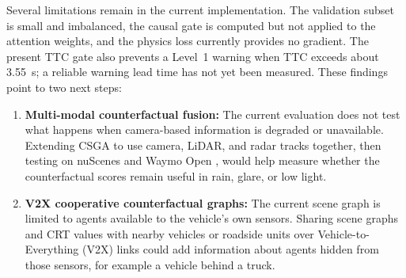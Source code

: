 Several limitations remain in the current implementation. The validation subset is small and imbalanced, the causal gate is computed but not applied to the attention weights, and the physics loss currently provides no gradient. The present TTC gate also prevents a Level~1 warning when TTC exceeds about 3.55~s; a reliable warning lead time has not yet been measured. These findings point to two next steps:
\begin{enumerate}
    \item \textbf{Multi-modal counterfactual fusion:} The current evaluation does not test what happens when camera-based information is degraded or unavailable. Extending CSGA to use camera, LiDAR, and radar tracks together, then testing on nuScenes \cite{caesar2020nuscenes} and Waymo Open \cite{sun2020waymo}, would help measure whether the counterfactual scores remain useful in rain, glare, or low light.
    \item \textbf{V2X cooperative counterfactual graphs:} The current scene graph is limited to agents available to the vehicle's own sensors. Sharing scene graphs and CRT values with nearby vehicles or roadside units over Vehicle-to-Everything (V2X) links could add information about agents hidden from those sensors, for example a vehicle behind a truck.
\end{enumerate}




